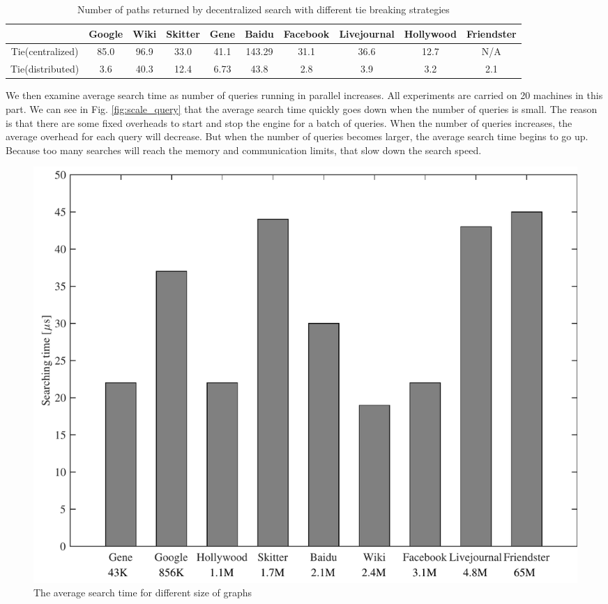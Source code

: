 \begin{table} [ht]
    \centering
    \begin{tabular}{cccccccccc} \hline
				&Google&Wiki&Skitter&Gene&Baidu&Facebook&Livejournal&Hollywood&Friendster \\ \hline
				Tie(centralized)&85.0&96.9&33.0&41.1&143.29&31.1&36.6&12.7&N/A \\ \hline
				Tie(distributed)&3.6&40.3&12.4&6.73&43.8&2.8&3.9&3.2&2.1 \\ \hline
    \end{tabular}
    \caption{Number of paths returned by decentralized search with different tie breaking strategies}
    \label{table:NOP}
\end{table}

We then examine average search time as number of queries running in parallel increases. All experiments are carried on 20 machines in this part. We can see in Fig. \ref{fig:scale_query} that the average search time quickly goes down when the number of queries is small. The reason is that there are some fixed overheads to start and stop the engine for a batch of queries. When the number of queries increases, the average overhead for each query will decrease. But when the number of queries becomes larger, the average search time begins to go up.  Because too many searches will reach the memory and communication limits, that slow down the search speed.

\begin{figure}[t]
    \centering
    \includegraphics[width=\linewidth]{./figures/scale_graph.pdf}
    \caption{The average search time for different size of graphs}
    \label{fig:scale_graph}
\end{figure}


